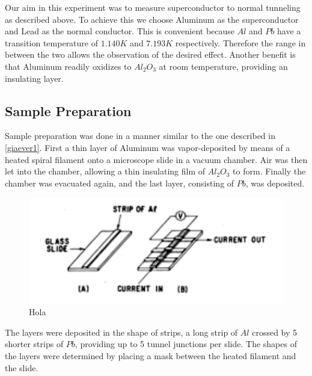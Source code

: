 
Our aim in this experiment was to measure superconductor to normal tunneling as described above. To achieve this we choose Aluminum as the superconductor and Lead as the normal conductor. This is convenient because $Al$ and $Pb$ have a transition temperature of $1.140 K$ and $7.193 K$ respectively. Therefore the range in between the two allows the observation of the desired effect. Another benefit is that Aluminum readily oxidizes to $Al_2O_3$ at room temperature, providing an insulating layer.\\

\subsection{Sample Preparation}
Sample preparation was done in a manner similar to the one described in \ref{giaever1}. First a thin layer of Aluminum was vapor-deposited by means of a heated spiral filament onto a microscope slide in a vacuum chamber. Air was then let into the chamber, allowing a thin insulating film of $Al_2O_3$ to form. Finally the chamber was evacuated again, and the last layer, consisting of $Pb$, was deposited.\\

\begin{figure}
\centering
\includegraphics[scale=1]{sample.pdf}
\caption{Hola\label{sample}}
\end{figure}


The layers were deposited in the shape of strips, a long strip of $Al$ crossed by 5 shorter strips of $Pb$, providing up to 5 tunnel junctions per slide. The shapes of the layers were determined by placing a mask between the heated filament and the slide.\\

 \\

